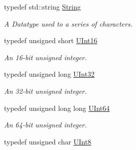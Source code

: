 \begin{DoxyCompactItemize}
\item 
typedef std::string \hyperlink{namespaceMezzanine_acf9fcc130e6ebf08e3d8491aebcf1c86}{String}
\begin{DoxyCompactList}\small\item\em A Datatype used to a series of characters. \item\end{DoxyCompactList}\item 
\hypertarget{namespaceMezzanine_a1b6c09063432c7ddd87011c88306c767}{
typedef unsigned short \hyperlink{namespaceMezzanine_a1b6c09063432c7ddd87011c88306c767}{UInt16}}
\label{namespaceMezzanine_a1b6c09063432c7ddd87011c88306c767}

\begin{DoxyCompactList}\small\item\em An 16-\/bit unsigned integer. \item\end{DoxyCompactList}\item 
\hypertarget{namespaceMezzanine_abea3b8e8e9b03d2547b2800284ba682d}{
typedef unsigned long \hyperlink{namespaceMezzanine_abea3b8e8e9b03d2547b2800284ba682d}{UInt32}}
\label{namespaceMezzanine_abea3b8e8e9b03d2547b2800284ba682d}

\begin{DoxyCompactList}\small\item\em An 32-\/bit unsigned integer. \item\end{DoxyCompactList}\item 
\hypertarget{namespaceMezzanine_ac690bcdbbe92a684875c5e8b16a33097}{
typedef unsigned long long \hyperlink{namespaceMezzanine_ac690bcdbbe92a684875c5e8b16a33097}{UInt64}}
\label{namespaceMezzanine_ac690bcdbbe92a684875c5e8b16a33097}

\begin{DoxyCompactList}\small\item\em An 64-\/bit unsigned integer. \item\end{DoxyCompactList}\item 
\hypertarget{namespaceMezzanine_aa5f38583d9025e05fa33d6e32e97b457}{
typedef unsigned char \hyperlink{namespaceMezzanine_aa5f38583d9025e05fa33d6e32e97b457}{UInt8}}
\label{namespaceMezzanine_aa5f38583d9025e05fa33d6e32e97b457}


\end{DoxyCompactItemize}
